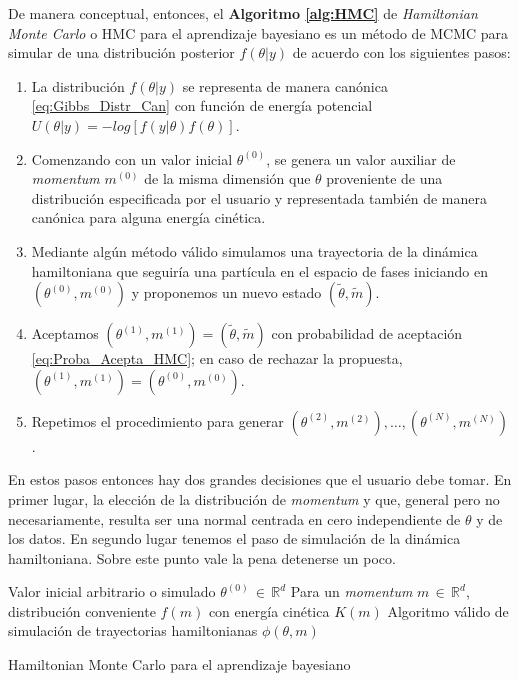 De manera conceptual, entonces, el \textbf{Algoritmo \ref{alg:HMC}} de \textit{Hamiltonian Monte Carlo} o HMC para el aprendizaje bayesiano es un método de MCMC para simular de una distribución posterior $f(\theta|y)$ de acuerdo con los siguientes pasos: 
\begin{enumerate}
\item La distribución $f(\theta|y)$ se representa de manera canónica \eqref{eq:Gibbs_Distr_Can} con función de energía potencial $U(\theta|y)=-log\left[f(y|\theta)f(\theta)\right]$.
\item Comenzando con un valor inicial $\theta^{(0)}$, se genera un valor auxiliar de \textit{momentum} $m^{(0)}$ de la misma dimensión que $\theta$ proveniente de una distribución especificada por el usuario y representada también de manera canónica para alguna energía cinética.
\item Mediante algún método válido simulamos una trayectoria de la dinámica hamiltoniana que seguiría una partícula en el espacio de fases iniciando en $(\theta^{(0)},m^{(0)})$ y proponemos un nuevo estado $(\tilde{\theta},\tilde{m})$.
\item Aceptamos $(\theta^{(1)},m^{(1)})=(\tilde{\theta},\tilde{m})$ con probabilidad de aceptación \eqref{eq:Proba_Acepta_HMC}; en caso de rechazar la propuesta, $(\theta^{(1)},m^{(1)})=(\theta^{(0)},m^{(0)})$. 
\item Repetimos el procedimiento para generar $(\theta^{(2)},m^{(2)}),\dots,(\theta^{(N)},m^{(N)})$.\\
\end{enumerate}

En estos pasos entonces hay dos grandes decisiones que el usuario debe tomar. En primer lugar, la elección de la distribución de \textit{momentum} y que, general pero no necesariamente, resulta ser una normal centrada en cero independiente de $\theta$ y de los datos. En segundo lugar tenemos el paso de simulación de la dinámica hamiltoniana. Sobre este punto vale la pena detenerse un poco.\\ 

\begin{algorithm}
\DontPrintSemicolon
Valor inicial arbitrario o simulado $\theta^{(0)} \,\in\, \mathbb{R}^d$\;
Para un \textit{momentum} $m \,\in\, \mathbb{R}^d$, distribución conveniente $f(m)$ con energía cinética $K(m)$\;
Algoritmo válido de simulación de trayectorias hamiltonianas $\phi(\theta,m)$\;
\caption{Hamiltonian Monte Carlo para el aprendizaje bayesiano \label{alg:HMC}}
\end{algorithm}

